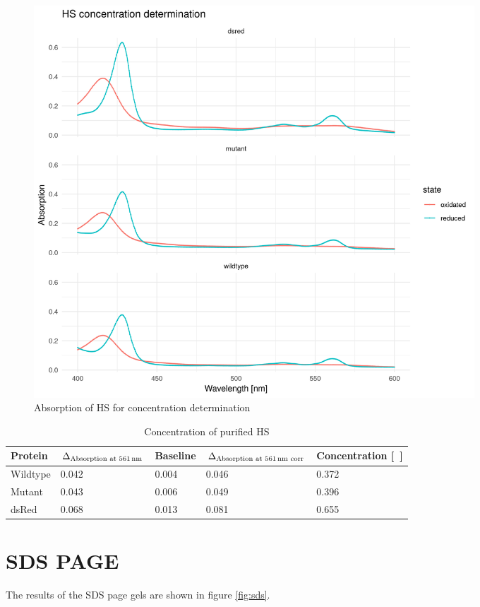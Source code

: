 \begin{figure}
	\centering
	\includegraphics[width=0.8\textwidth]{img/hs_concentration.png}
	\caption{Absorption of HS for concentration determination}
	\label{fig:hs_concentration}
\end{figure}

\begin{table}
	\centering
	\begin{tabu}{lllll}
		\toprule
		Protein & $\Delta_{\text{Absorption at \SI{561}{\nm}}}$ & Baseline & $\Delta_{\text{Absorption at \SI{561}{\nm} corr}}$ & Concentration [\si{\milli\Molar}] \\
		\midrule
		Wildtype & 0.042 & 0.004 & 0.046 & 0.372 \\
		Mutant & 0.043 & 0.006 & 0.049 & 0.396 \\
		dsRed & 0.068 & 0.013 & 0.081 & 0.655 \\
		\bottomrule
	\end{tabu}
	\caption{Concentration of purified HS}
	\label{tbl:hs_concentration}
\end{table}

\section{SDS PAGE}

The results of the SDS page gels are shown in figure \ref{fig:sds}.

